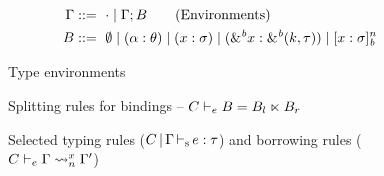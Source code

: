 \begin{figure}[tp]
  \begin{align*}
    \E &::=\ \Eempty \mid \E;B\tag{Environments}\\
    B &::=\ \bnone %
    \mid \bvar{\tvar}{\kschm} %
    \mid \bvar{x}{\schm}%
    \mid \bvar{\borrow{x}}{\borrowty{k}{\tau}}%
    \mid \svar{x}{\schm}^n %
  \end{align*}
  \vspace{-10pt}
  \caption{Type environments}
  \label{grammar:env}
  \vspace{5pt}
  \centering
    
    \vspace{-5pt}
    \caption{Splitting rules for bindings -- $C \vdash_e B = B_l \ltimes B_r$}
    \label{sdtyp:split}
  \vspace{-10pt}
\end{figure}


\begin{figure*}[tp]
    \vspace{-10pt}
    \caption{Selected typing rules ($C \operatorname{|} \Gamma \operatorname{\vdash_s} e : \tau$)
      and borrowing rules ($C \vdash_e \Gamma \rightsquigarrow_{n}^{x} \Gamma'$)} 
    \label{selectrules:borrow}
    \label{selectrules:binders}
    \label{sdtyp:app}
    \label{selectrules:region}
    \label{env:rule:borrow}
    \vspace{-5pt}
\end{figure*}

